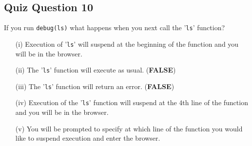 \documentclass[12pt]{article}
\begin{document}
\subsection*{Quiz Question 10}
If you run
\texttt{debug(ls)}
what happens when you next call the '\texttt{ls}' function?
\begin{enumerate}
\item[(i)] Execution of '\texttt{ls}' will suspend at the beginning of the function and you will be in the browser.
\item[(ii)] The '\texttt{ls}' function will execute as usual. (\textbf{FALSE})
\item[(iii)] The '\texttt{ls}' function will return an error. (\textbf{FALSE})
\item[(iv)] Execution of the '\texttt{ls}' function will suspend at the 4th line of the function and you will be in the browser.
\item[(v)] You will be prompted to specify at which line of the function you would like to suspend execution and enter the browser.
\end{enumerate}
\end{document}
